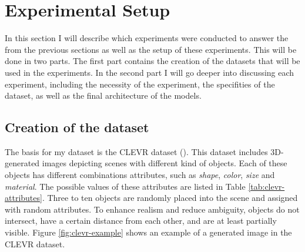 \section{Experimental Setup}
\label{sec:exp-setup}

In this section I will describe which experiments were conducted to answer the  from the previous sections as well as the setup of these experiments.
This will be done in two parts.
The first part contains the creation of the datasets that will be used in the experiments.
In the second part I will go deeper into discussing each experiment, including the necessity of the experiment, the specifities of the dataset, as well as the final architecture of the models.

\subsection{Creation of the dataset}
The basis for my dataset is the CLEVR dataset (\cite{Johnson2016}).
This dataset includes 3D-generated images depicting scenes with different kind of objects.
Each of these objects has different combinations attributes, such as \emph{shape}, \emph{color}, \emph{size} and \emph{material}.
The possible values of these attributes are listed in Table \ref{tab:clevr-attributes}.
Three to ten objects are randomly placed into the scene and assigned with random attributes.
To enhance realism and reduce ambiguity, objects do not intersect, have a certain distance from each other, and are at least partially visible.
Figure \ref{fig:clevr-example} shows an example of a generated image in the CLEVR dataset.

